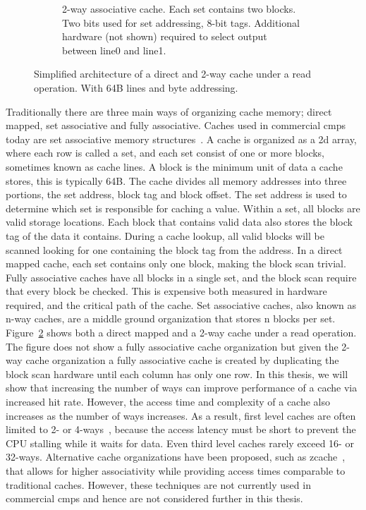 \begin{figure}
\begin{subfigure}[b]{0.45\textwidth}
        \caption{2-way associative cache. Each set contains two blocks. Two bits used for set addressing, 8-bit tags. Additional hardware (not shown) required to select output between line0 and line1.}
        \label{fig:introduction:cache:2way}
    \end{subfigure}
    \caption[Direct mapped and 2-way cache architecture.]{Simplified architecture of a direct and 2-way cache under a read operation. With 64B lines and byte addressing.}
    \label{fig:introduction:cache}
\end{figure}

Traditionally there are three main ways of organizing cache memory; direct mapped, set associative and fully associative.
Caches used in commercial \glspl{cmp} today are set associative memory structures~\cite{Thomadakis2011, Jain2013, ARM2010, Ho2014}.
A cache is organized as a 2d array, where each row is called a set, and each set consist of one or more blocks, sometimes known as cache lines.
A block is the minimum unit of data a cache stores, this is typically 64B.
The cache divides all memory addresses into three portions, the set address, block tag and block offset.
The set address is used to determine which set is responsible for caching a value.
Within a set, all blocks are valid storage locations.
Each block that contains valid data also stores the block tag of the data it contains.
During a cache lookup, all valid blocks will be scanned looking for one containing the block tag from the address.
In a direct mapped cache, each set contains only one block, making the block scan trivial.
Fully associative caches have all blocks in a single set, and the block scan require that every block be checked.
This is expensive both measured in hardware required, and the critical path of the cache.
Set associative caches, also known as n-way caches, are a middle ground organization that stores n blocks per set.
Figure~\ref{fig:introduction:cache} shows both a direct mapped and a 2-way cache under a read operation.
The figure does not show a fully associative cache organization but given the 2-way cache organization a fully associative cache is created by duplicating the block scan hardware until each column has only one row.
In this thesis, we will show that increasing the number of ways can improve performance of a cache via increased hit rate.
However, the access time and complexity of a cache also increases as the number of ways increases.
As a result, first level caches are often limited to 2- or 4-ways~\cite{Sanchez2010}, because the access latency must be short to prevent the CPU stalling while it waits for data. 
Even third level caches rarely exceed 16- or 32-ways.
Alternative cache organizations have been proposed, such as zcache~\cite{Sanchez2010}, that allows for higher associativity while providing access times comparable to traditional caches.
However, these techniques are not currently used in commercial \glspl{cmp} and hence are not considered further in this thesis.

